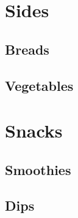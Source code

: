 \documentclass[twoside, openany]{book}
\newcommand{\dish}[1]{}
\begin{document}
\chapter{Sides}


\section{Breads}

\dish{Biscuits}

\dish{Cornbread}

\dish{Dinner_rolls}

\dish{Cheddar_chive_cornbread}

\dish{Squash_corn_muffins}


\section{Vegetables}

\dish{Baked_potatoes}

\dish{Brussels_sprouts}

\dish{Corn}

\dish{Corn_and_bean_salad}

\dish{Green_beans}

\dish{Mashed_potatoes}

\dish{Roast_vegetables}

\dish{Roast_potatoes_metric}






\chapter{Snacks}

\section{Smoothies}

\dish{Berry_smoothie}

\dish{Green_tea_smoothie}

\section{Dips}

\dish{Black_bean_dip}

\dish{Salsa}
\end{document}
